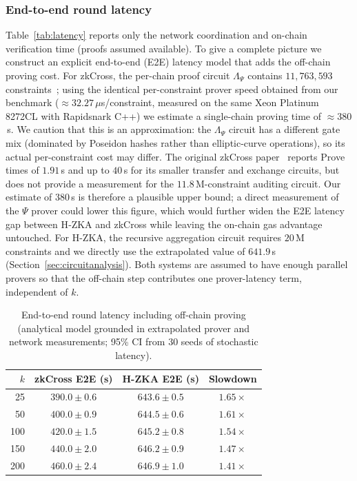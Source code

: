 \documentclass[journal]{IEEEtran}
\begin{document}
\subsubsection{End-to-end round latency}
\label{sec:e2e}

Table~\ref{tab:latency} reports only the network coordination and on-chain verification time (proofs assumed available). To give a complete picture we construct an explicit {end-to-end} (E2E) latency model that adds the off-chain proving cost. For zkCross, the per-chain proof circuit $\Lambda_\Psi$ contains $11{,}763{,}593$ constraints~\cite{guo2024zkcross}; using the identical per-constraint prover speed obtained from our benchmark ($\approx 32.27\,\mu$s/constraint, measured on the same Xeon Platinum 8272CL with Rapidsnark C++) we estimate a single-chain proving time of $\approx 380$\,s. We caution that this is an approximation: the $\Lambda_\Psi$ circuit has a different gate mix (dominated by Poseidon hashes rather than elliptic-curve operations), so its actual per-constraint cost may differ. The original zkCross paper~\cite{guo2024zkcross} reports Prove times of $1.91$\,s and up to $40$\,s for its smaller transfer and exchange circuits, but does not provide a measurement for the $11.8$\,M-constraint auditing circuit. Our estimate of $380$\,s is therefore a plausible upper bound; a direct measurement of the $\Psi$ prover could lower this figure, which would further widen the E2E latency gap between H‑ZKA and zkCross while leaving the on-chain gas advantage untouched. For H-ZKA, the recursive aggregation circuit requires $20$\,M constraints and we directly use the extrapolated value of $641.9$\,s (Section~\ref{sec:circuitanalysis}). Both systems are assumed to have enough parallel provers so that the off-chain step contributes one prover-latency term, independent of $k$.

\begin{table}[h!]
\centering
\caption{End-to-end round latency including off-chain proving (analytical model grounded in extrapolated prover and network measurements; 95\% CI from $30$ seeds of stochastic latency).}
\label{tab:e2e}
\begin{tabular}{rccc}
\toprule
$k$ & zkCross E2E (s) & H-ZKA E2E (s) & Slowdown \\
\midrule
25  & $390.0 \pm 0.6$  & $643.6 \pm 0.5$ & $1.65\times$ \\
50  & $400.0 \pm 0.9$  & $644.5 \pm 0.6$ & $1.61\times$ \\
100 & $420.0 \pm 1.5$  & $645.2 \pm 0.8$ & $1.54\times$ \\
150 & $440.0 \pm 2.0$  & $646.2 \pm 0.9$ & $1.47\times$ \\
200 & $460.0 \pm 2.4$  & $646.9 \pm 1.0$ & $1.41\times$ \\
\bottomrule
\end{tabular}
\end{table}
\end{document}
